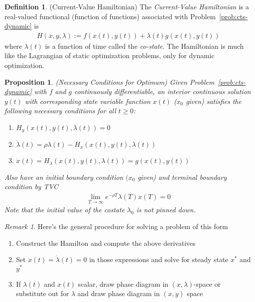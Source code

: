 \documentclass[12pt]{book}
\numberwithin{equation}{section} %
\theoremstyle{plain}
\newtheorem{prop}[thm]{Proposition}
\theoremstyle{definition}
\newtheorem{defn}[thm]{Definition}
\theoremstyle{remark}
\newtheorem*{rmk}{Remark}
\newcommand{\limT}{\lim_{T\rightarrow\infty}}
\begin{document}
\begin{defn}{(Current-Value Hamiltonian)}
The \emph{Current-Value Hamiltonian} is a real-valued functional
(function of functions) associated with Problem~\ref{prob:cts-dynamic}
is
\begin{align*}
  H(x,y,\lambda) := f(x(t),y(t)) + \lambda(t) g(x(t),y(t))
\end{align*}
where $\lambda(t)$ is a function of time called the \emph{co-state}.
The Hamiltonian is much like the Lagrangian of static optimization
problems, only for dynamic optimization.
\end{defn}

\begin{prop}\emph{(Necessary Conditions for Optimum)}
Given Problem~\ref{prob:cts-dynamic} with $f$ and $g$ continuously
differentiable, an interior continuous solution $y(t)$ with corresponding
state variable function $x(t)$ ($x_0$ given) satisfies the following
necessary conditions for all $t\geq 0$:
\begin{enumerate}
  \item $H_y (x(t),y(t),\lambda(t)) = 0$
  \item $\dot{\lambda}(t) = \rho\lambda(t)- H_x(x(t), y(t), \lambda(t))$
  \item $\dot{x}(t) = H_\lambda(x(t),y(t),\lambda(t)) = g(x(t), y(t))$
\end{enumerate}
Also have an initial boundary condition $(x_0$ given) and terminal
boundary condition by TVC
\begin{align*}
  \limT e^{-\rho T} \lambda(T)x(T)=0
\end{align*}
Note that the initial value of the costate $\lambda_0$ is \emph{not}
pinned down.
\end{prop}
\begin{rmk}
Here's the general procedure for solving a problem of this form
\begin{enumerate}[label=(\roman*)]
  \item Construct the Hamilton and compute the above derivatives
  \item Set $\dot{x}(t)=\dot{\lambda}(t)=0$ in those expressions and solve
    for steady state $x^*$ and $y^*$
  \item
    If $\lambda(t)$ and $x(t)$ scalar, draw phase diagram in
    $(x,\lambda)$-space or substitute out for $\lambda$ and draw phase
    diagram in $(x,y)$ space
\end{enumerate}
\end{rmk}

\end{document}
